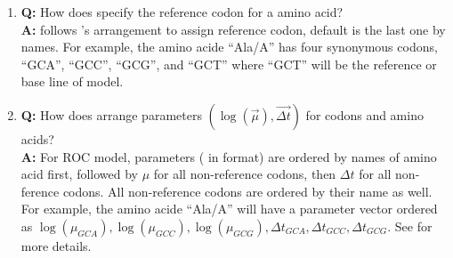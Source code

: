\begin{enumerate}
\item {\bf\color{blue} Q:}
      How does  specify the reference codon for a amino acid? \\
      {\bf\color{blue} A:}
       follows 's arrangement to assign reference codon,
      default is the last one by names.
      For example, the amino acide ``Ala/A''
      has four synonymous codons, ``GCA'', ``GCC'', ``GCG'', and ``GCT'' where
      ``GCT'' will be the reference or base line of model.

\item {\bf\color{blue} Q:}
      How does  arrange parameters
      $(\log(\vec{\mu}), \vec{\Delta t})$
      for codons and amino acids? \\
      {\bf\color{blue} A:}
      For ROC model, parameters ( in  format) are
      ordered by names of amino
      acid first, followed by $\mu$ for all non-reference codons, then
      $\Delta t$ for all non-ference codons. All non-reference codons are
      ordered by their name as well.
      For example, the amino acide ``Ala/A'' will have a parameter vector
      ordered as
      $\log(\mu_{GCA}), \log(\mu_{GCC}), \log(\mu_{GCG}),\allowbreak
       \Delta t_{GCA}, \Delta t_{GCC}, \Delta t_{GCG}$.
      See  for more details.

\end{enumerate}

